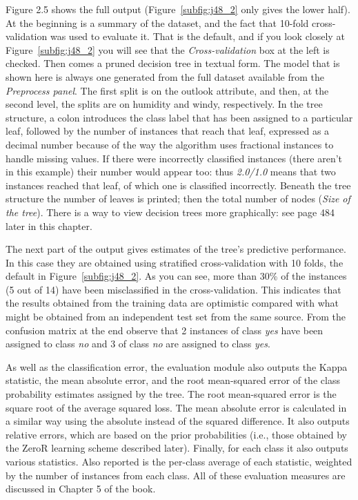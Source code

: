 Figure 2.5 shows the full output (Figure~\ref{subfig:j48_2} only gives
the lower half). At the beginning is a summary of the dataset, and the
fact that 10-fold cross-validation was used to evaluate it. That is
the default, and if you look closely at Figure~\ref{subfig:j48_2} you
will see that the \textit{Cross-validation} box at the left is
checked. Then comes a pruned decision tree in textual form. The model
that is shown here is always one generated from the full dataset
available from the \textit{Preprocess panel}. The first split is on
the outlook attribute, and then, at the second level, the splits are
on humidity and windy, respectively. In the tree structure, a colon
introduces the class label that has been assigned to a particular
leaf, followed by the number of instances that reach that leaf,
expressed as a decimal number because of the way the algorithm uses
fractional instances to handle missing values. If there were
incorrectly classified instances (there aren’t in this example) their
number would appear too: thus \textit{2.0/1.0} means that two
instances reached that leaf, of which one is classified
incorrectly. Beneath the tree structure the number of leaves is
printed; then the total number of nodes (\textit{Size of the
  tree}). There is a way to view decision trees more graphically: see
page 484 later in this chapter.


The next part of the output gives estimates of the tree's predictive
performance. In this case they are obtained using stratified
cross-validation with 10 folds, the default in
Figure~\ref{subfig:j48_2}. As you can see, more than 30\% of the
instances (5 out of 14) have been misclassified in the
cross-validation. This indicates that the results obtained from the
training data are optimistic compared with what might be obtained from
an independent test set from the same source. From the confusion
matrix at the end observe that 2 instances of class \textit{yes} have
been assigned to class \textit{no} and 3 of class \textit{no} are
assigned to class \textit{yes}.

As well as the classification error, the evaluation module also
outputs the Kappa statistic, the mean absolute error, and the root
mean-squared error of the class probability estimates assigned by the
tree. The root mean-squared error is the square root of the average
squared loss. The mean absolute error is calculated in a similar way
using the absolute instead of the squared difference. It also outputs
relative errors, which are based on the prior probabilities (i.e.,
those obtained by the ZeroR learning scheme described later). Finally,
for each class it also outputs various statistics. Also reported is
the per-class average of each statistic, weighted by the number of
instances from each class. All of these evaluation measures are
discussed in Chapter 5 of the book.

